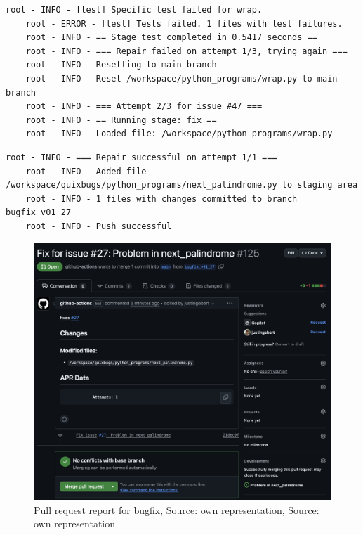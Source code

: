 \begin{lstlisting}[style=log, caption={Iterative patch generation log excerpt}, label={fig:retry}]
    root - INFO - [test] Specific test failed for wrap.
    root - ERROR - [test] Tests failed. 1 files with test failures.
    root - INFO - == Stage test completed in 0.5417 seconds ==
    root - INFO - === Repair failed on attempt 1/3, trying again ===
    root - INFO - Resetting to main branch
    root - INFO - Reset /workspace/python_programs/wrap.py to main branch
    root - INFO - === Attempt 2/3 for issue #47 ===
    root - INFO - == Running stage: fix ==
    root - INFO - Loaded file: /workspace/python_programs/wrap.py
\end{lstlisting}

\begin{lstlisting}[style=log, caption={Branch and commit created for bugfix}, label={lst:branch-commit}]
    root - INFO - === Repair successful on attempt 1/1 ===
    root - INFO - Added file /workspace/quixbugs/python_programs/next_palindrome.py to staging area
    root - INFO - 1 files with changes committed to branch bugfix_v01_27
    root - INFO - Push successful
\end{lstlisting}


\begin{figure}[H]
    \centering
    \includegraphics[width=1\textwidth]{images/verification/pr.png}
    \caption{Pull request report for bugfix, Source: own representation, Source: own representation}
    \label{fig:pr-report}
\end{figure}

